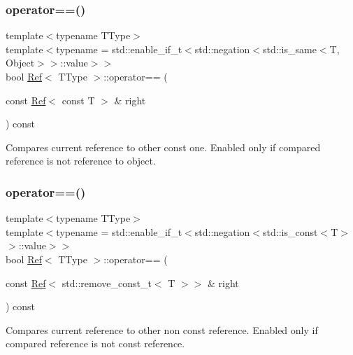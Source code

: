 \subsubsection{\texorpdfstring{operator==()}{operator==()}\hspace{0.1cm}{\footnotesize\ttfamily [1/3]}}
{\footnotesize\ttfamily template$<$typename T\+Type$>$ \\
template$<$typename  = std\+::enable\+\_\+if\+\_\+t$<$std\+::negation$<$std\+::is\+\_\+same$<$\+T, Object$>$$>$\+::value$>$$>$ \\
bool \mbox{\hyperlink{class_ref}{Ref}}$<$ T\+Type $>$\+::operator== (\begin{DoxyParamCaption}\item[{const \mbox{\hyperlink{class_ref}{Ref}}$<$ const T $>$ \&}]{right }\end{DoxyParamCaption}) const\hspace{0.3cm}{\ttfamily [inline]}}



Compares current reference to other const one. Enabled only if compared reference is not reference to object. 

\mbox{\label{class_ref_a27a33c7a0fb318d86cbe5bf5ec206bd5}} 
\subsubsection{\texorpdfstring{operator==()}{operator==()}\hspace{0.1cm}{\footnotesize\ttfamily [2/3]}}
{\footnotesize\ttfamily template$<$typename T\+Type$>$ \\
template$<$typename  = std\+::enable\+\_\+if\+\_\+t$<$std\+::negation$<$std\+::is\+\_\+const$<$\+T$>$$>$\+::value$>$$>$ \\
bool \mbox{\hyperlink{class_ref}{Ref}}$<$ T\+Type $>$\+::operator== (\begin{DoxyParamCaption}\item[{const \mbox{\hyperlink{class_ref}{Ref}}$<$ std\+::remove\+\_\+const\+\_\+t$<$ T $>$$>$ \&}]{right }\end{DoxyParamCaption}) const\hspace{0.3cm}{\ttfamily [inline]}}



Compares current reference to other non const reference. Enabled only if compared reference is not const reference. 

